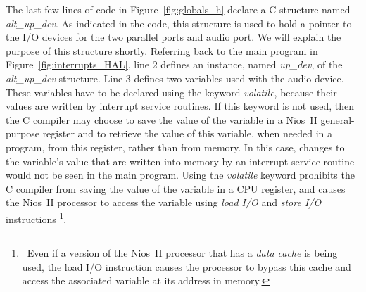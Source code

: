 \documentclass[11pt, twoside, pdftex]{article}
\begin{document}
The last few lines of code in Figure~\ref{fig:globals_h} declare a C structure named {\it alt\_up\_dev}. As indicated in
the code, this structure is used to hold a pointer to the I/O devices for the two parallel ports and audio port. We
will explain the purpose of this structure shortly. Referring back to the main program in
Figure~\ref{fig:interrupts_HAL}, line 2 defines an instance, named {\it up\_dev}, of the {\it alt\_up\_dev}
structure.  Line 3 defines two variables used with the audio device. 
These variables have to be declared using the keyword {\it
volatile}, because their values are written by interrupt service routines. If this keyword is not used, then the C
compiler may choose to save the value of the variable in a Nios~II general-purpose register and to retrieve the
value of this variable, when needed in a program, from this register, rather than from memory. In this case,
changes to the variable's value that are written into memory by an interrupt service routine would not be seen in 
the main program.  Using the {\it volatile} keyword prohibits the C compiler from saving the value of the variable 
in a CPU register, and causes the Nios~II processor to access the variable using 
{\it load I/O} and {\it store I/O} instructions \footnote{~Even if a version of the Nios~II 
processor that has a {\it data cache} is being used, the load
I/O instruction causes the processor to bypass this cache and access the associated variable at its address in memory.}.
\end{document}
